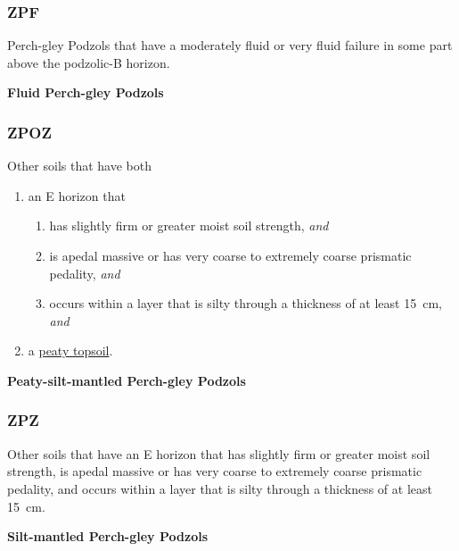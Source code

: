 \documentclass[
  letterpaper,
  DIV=11,
  numbers=noendperiod]{scrreprt}
\providecommand{\tightlist}{%
  \setlength{\itemsep}{0pt}\setlength{\parskip}{0pt}}\usepackage{longtable,booktabs,array}
\begin{document}
\hypertarget{sec-key-ZDF}{%
\subsubsection{\texorpdfstring{\textbf{ZPF}}{ZPF}}\label{sec-key-ZDF}}

Perch-gley Podzols that have a moderately fluid or very fluid failure in
some part above the podzolic-B horizon.

\textbf{Fluid Perch-gley Podzols}

\hypertarget{sec-key-ZPOZ}{%
\subsubsection{\texorpdfstring{\textbf{ZPOZ}}{ZPOZ}}\label{sec-key-ZPOZ}}

Other soils that have both

\begin{enumerate}
\def\labelenumi{\arabic{enumi}.}
\tightlist
\item
  an E horizon that

  \begin{enumerate}
  \def\labelenumii{(\alph{enumii})}
  \tightlist
  \item
    has slightly firm or greater moist soil strength, \emph{and}
  \item
    is apedal massive or has very coarse to extremely coarse prismatic
    pedality, \emph{and}
  \item
    occurs within a layer that is silty through a thickness of at least
    15~cm, \emph{and}
  \end{enumerate}
\item
  a \protect\hyperlink{sec-diag-pts}{peaty topsoil}.
\end{enumerate}

\textbf{Peaty-silt-mantled Perch-gley Podzols}

\hypertarget{sec-key-ZPZ}{%
\subsubsection{\texorpdfstring{\textbf{ZPZ}}{ZPZ}}\label{sec-key-ZPZ}}

Other soils that have an E horizon that has slightly firm or greater
moist soil strength, is apedal massive or has very coarse to extremely
coarse prismatic pedality, and occurs within a layer that is silty
through a thickness of at least 15~cm.

\textbf{Silt-mantled Perch-gley Podzols}
\end{document}
